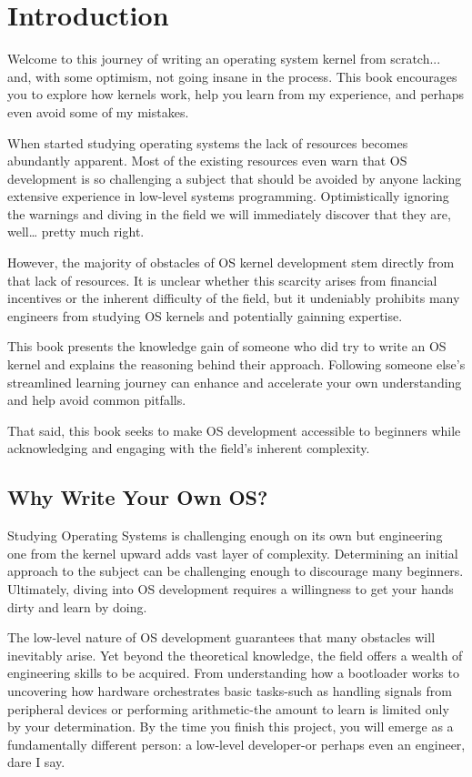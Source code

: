 \chapter{Introduction}

Welcome to this journey of writing an operating system kernel from scratch... and, with some optimism, not going insane in the 
process. This book encourages you to explore how kernels work, help you learn from my experience, and 
perhaps even avoid some of my mistakes. 

When started studying operating systems the lack of resources becomes abundantly apparent. Most of the existing resources even
warn that OS development is so challenging a subject that should be avoided by anyone lacking extensive experience
in low-level systems programming. Optimistically ignoring the warnings and diving in the field we will immediately discover 
that they are, well… pretty much right.

However, the majority of obstacles of OS kernel development stem directly from that lack of resources.
It is unclear whether this scarcity arises from financial incentives or the inherent difficulty of the field, 
but it undeniably prohibits many engineers from studying OS kernels and potentially gainning expertise.

This book presents the knowledge gain of someone who did try to write an OS kernel and explains the reasoning behind their 
approach. Following someone else's streamlined learning journey can enhance and accelerate your own understanding 
and help avoid common pitfalls.

That said, this book seeks to make OS development accessible to beginners while acknowledging and engaging with the 
field's inherent complexity.

\section{Why Write Your Own OS?}

Studying Operating Systems is challenging enough on its own but engineering one from the kernel upward adds vast layer of
complexity. Determining an initial approach to the subject can be challenging enough to discourage many beginners. 
Ultimately, diving into OS development requires a willingness to get your hands dirty and learn by doing.

The low-level nature of OS development guarantees that many obstacles will inevitably arise. 
Yet beyond the theoretical knowledge, the field offers a wealth of engineering skills to be acquired. 
From understanding how a bootloader works to uncovering how hardware orchestrates basic tasks-such as handling 
signals from peripheral devices or performing arithmetic-the amount to learn is limited only by your determination. 
By the time you finish this project, you will emerge as a fundamentally different person: a low-level developer-or 
perhaps even an engineer, dare I say.

